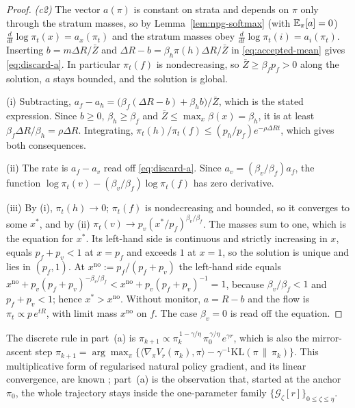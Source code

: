 \begin{proof}
\emph{(c2)} The vector $a(\pi)$ is constant on strata and depends on $\pi$
only through the stratum masses, so by Lemma~\ref{lem:npg-softmax}
(with $\mathbb{E}_\pi[a]=0$) $\frac{d}{dt}\log\pi_t(x)=a_x(\pi_t)$ and the stratum
masses obey $\frac{d}{dt}\log\pi_t(i)=a_i(\pi_t)$. Inserting
$b=m\Delta R/\bar Z$ and $\Delta R-b=\beta_h\pi(h)\Delta R/\bar Z$ in
\eqref{eq:accepted-mean} gives \eqref{eq:discard-a}. In particular
$\pi_t(f)$ is nondecreasing, so $\bar Z\ge\beta_fp_f>0$ along the solution,
$a$ stays bounded, and the solution is global.

(i) Subtracting, $a_f-a_h=\bigl(\beta_f(\Delta R-b)+\beta_hb\bigr)/\bar Z$,
which is the stated expression. Since $b\ge0$, $\beta_h\ge\beta_f$ and
$\bar Z\le\max_x\beta(x)=\beta_h$, it is at least
$\beta_f\Delta R/\beta_h=\rho\Delta R$. Integrating,
$\pi_t(h)/\pi_t(f)\le(p_h/p_f)e^{-\rho\Delta Rt}$, which gives both
consequences.

(ii) The rate is $a_f-a_v$ read off \eqref{eq:discard-a}. Since
$a_v=(\beta_v/\beta_f)a_f$, the function
$\log\pi_t(v)-(\beta_v/\beta_f)\log\pi_t(f)$ has zero derivative.

(iii) By (i), $\pi_t(h)\to0$; $\pi_t(f)$ is nondecreasing and bounded, so it
converges to some $x^\ast$, and by (ii) $\pi_t(v)\to p_v(x^\ast/p_f)^{\beta_v/\beta_f}$.
The masses sum to one, which is the equation for $x^\ast$. Its left-hand
side is continuous and strictly increasing in $x$, equals $p_f+p_v<1$ at
$x=p_f$ and exceeds $1$ at $x=1$, so the solution is unique and lies in
$(p_f,1)$. At $x^{\mathrm{no}}:=p_f/(p_f+p_v)$ the left-hand side equals
$x^{\mathrm{no}}+p_v(p_f+p_v)^{-\beta_v/\beta_f}<x^{\mathrm{no}}+p_v(p_f+p_v)^{-1}=1$,
because $\beta_v/\beta_f<1$ and $p_f+p_v<1$; hence
$x^\ast>x^{\mathrm{no}}$. Without monitor, $a=R-b$ and the flow is
$\pi_t\propto p\,e^{tR}$, with limit mass $x^{\mathrm{no}}$ on $f$. The case $\beta_v=0$ is read off the equation.
\end{proof}

\begin{remark}\label{rem:mirror}
The discrete rule in part~(a) is
$\pi_{k+1}\propto\pi_k^{\,1-\gamma/\eta}\,\pi_0^{\,\gamma/\eta}\,e^{\gamma r}$,
which is also the mirror-ascent step
$\pi_{k+1}=\arg\max_\pi\{\langle\nabla_\pi V_r(\pi_k),\pi\rangle-\gamma^{-1}\mathrm{KL}(\pi\,\|\,\pi_k)\}$.
This multiplicative form of regularised natural policy gradient, and its
linear convergence, are known \cite{cen2022fast}; part~(a) is the
observation that, started at the anchor $\pi_0$, the whole trajectory stays
inside the one-parameter family
$\{\mathcal G_\zeta[r]\}_{0\le\zeta\le\eta}$.
\end{remark}


